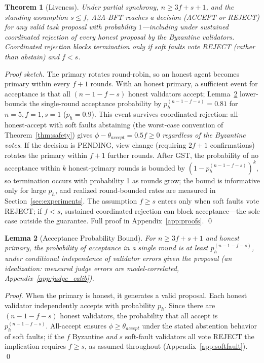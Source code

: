 \documentclass{article}
\newtheorem{theorem}{Theorem}[section]
\newtheorem{lemma}[theorem]{Lemma}
\begin{document}
\begin{theorem}[Liveness]
\label{thm:liveness}
Under partial synchrony, $n \geq 3f + s + 1$, and the standing assumption $s \leq f$, A2A-BFT reaches a decision (ACCEPT or REJECT) for any valid task proposal with probability $1$---\emph{including} under sustained coordinated rejection of every honest proposal by the Byzantine validators. Coordinated rejection blocks termination only if soft faults vote REJECT (rather than abstain) and $f < s$.
\end{theorem}

\begin{proof}[Proof sketch]
The primary rotates round-robin, so an honest agent becomes primary within every $f+1$ rounds. With an honest primary, a sufficient event for acceptance is that all $(n-1-f-s)$ honest validators accept; Lemma~\ref{lem:acceptance} lower-bounds the single-round acceptance probability by $p_h^{(n-1-f-s)} = 0.81$ for $n{=}5, f{=}1, s{=}1$ ($p_h = 0.9$). This event survives coordinated rejection: all-honest-accept with soft faults abstaining (the worst-case convention of Theorem~\ref{thm:safety}) gives $\phi - \theta_{accept} = 0.5f \geq 0$ \emph{regardless of the Byzantine votes}. If the decision is PENDING, view change (requiring $2f+1$ confirmations) rotates the primary within $f+1$ further rounds. After GST, the probability of no acceptance within $k$ honest-primary rounds is bounded by $(1 - p_h^{(n-1-f-s)})^k$, so termination occurs with probability 1 as rounds grow; the bound is informative only for large $p_h$, and realized round-bounded rates are measured in Section~\ref{sec:experiments}. The assumption $f \geq s$ enters only when soft faults vote REJECT; if $f < s$, sustained coordinated rejection can block acceptance---the sole case outside the guarantee. Full proof in Appendix~\ref{app:proofs}. \qed
\end{proof}

\begin{lemma}[Acceptance Probability Bound]
\label{lem:acceptance}
For $n \geq 3f + s + 1$ and honest primary, the probability of acceptance in a single round is at least $p_h^{(n-1-f-s)}$, under conditional independence of validator errors given the proposal (an idealization: measured judge errors are model-correlated, Appendix~\ref{app:judge_calib}).
\end{lemma}

\begin{proof}
When the primary is honest, it generates a valid proposal. Each honest validator independently accepts with probability $p_h$. Since there are $(n-1-f-s)$ honest validators, the probability that all accept is $p_h^{(n-1-f-s)}$. All-accept ensures $\phi \geq \theta_{accept}$ under the stated abstention behavior of soft faults; if the $f$ Byzantine \emph{and} $s$ soft-fault validators all vote REJECT the implication requires $f \geq s$, as assumed throughout (Appendix~\ref{app:softfault}). \qed
\end{proof}
\end{document}
